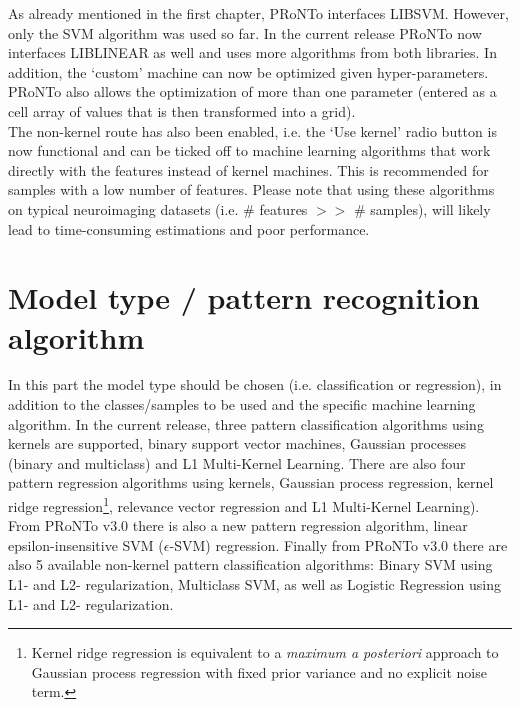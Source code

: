 As already mentioned in the first chapter, PRoNTo interfaces LIBSVM. However, only the SVM algorithm was used so far. In the current release PRoNTo now interfaces LIBLINEAR as well and uses more algorithms from both libraries. In addition, the `custom' machine can now be optimized given hyper-parameters. PRoNTo also allows the optimization of more than one parameter (entered as a cell array of values that is then transformed into a grid).
\\

The non-kernel route has also been enabled, i.e. the `Use kernel' radio button is now functional and can be ticked off to machine learning algorithms that work directly with the features instead of kernel machines. This is recommended for samples with a low number of features. Please note that using these algorithms on typical neuroimaging datasets (i.e. \# features $>>$ \# samples), will likely lead to time-consuming estimations and poor performance.


\section{Model type / pattern recognition algorithm}

In this part the model type should be chosen (i.e. classification or regression), in addition to the classes/samples to be used and the specific machine learning algorithm. In the current release, three pattern classification algorithms using kernels are supported, binary support vector machines, Gaussian processes (binary and multiclass) and L1 Multi-Kernel Learning. There are also four pattern regression algorithms using kernels, Gaussian process regression, kernel ridge regression\footnote{Kernel ridge regression is equivalent to a \emph{maximum a posteriori} approach to Gaussian process regression with fixed prior variance and no explicit noise term.}, relevance vector regression and L1 Multi-Kernel Learning). From PRoNTo v3.0 there is also a new pattern regression algorithm, linear epsilon-insensitive SVM ($\epsilon$-SVM) regression. Finally from PRoNTo v3.0 there are also 5 available non-kernel pattern classification algorithms: Binary SVM using L1- and L2- regularization, Multiclass SVM, as well as Logistic Regression using L1- and L2- regularization.
\\

